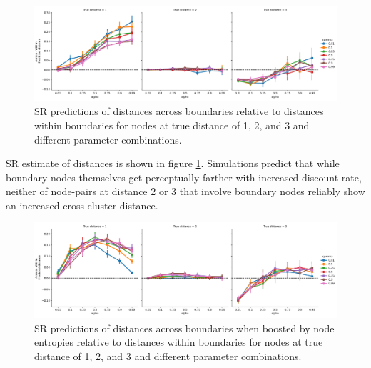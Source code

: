 \begin{figure}
    \centering
    \includegraphics[width = \textwidth]{chapter_notebooks/chapter_3/figures/distance_predictions.png}
    \caption{SR predictions of distances across boundaries relative to distances within boundaries for nodes at true distance of 1, 2, and 3 and different parameter combinations.}
    \label{fig:SR-distance-estimate}
\end{figure}

SR estimate of distances is shown in figure \ref{fig:SR-distance-estimate}. Simulations predict that while boundary nodes themselves get perceptually farther with increased discount rate, neither of node-pairs at distance 2 or 3 that involve boundary nodes reliably show an increased cross-cluster distance.

\begin{figure}
    \centering
    \includegraphics[width = \textwidth]{chapter_notebooks/chapter_3/figures/distance_predictions_entropyboost.png}
    \caption{SR predictions of distances across boundaries when boosted by node entropies relative to distances within boundaries for nodes at true distance of 1, 2, and 3 and different parameter combinations.}
    \label{fig:SR-distance-estimate-entropy-boost}
\end{figure}

